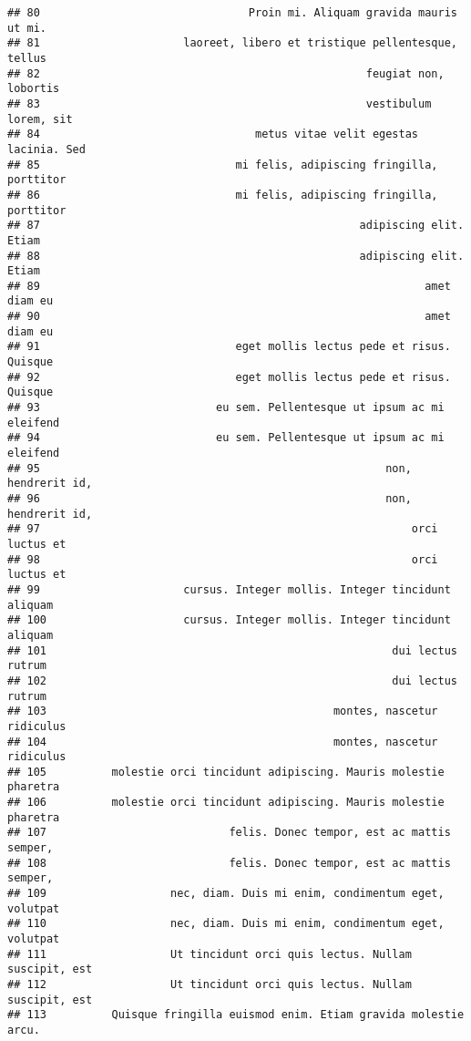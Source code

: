 \documentclass[
]{article}
\begin{document}
\begin{verbatim}
## 80                                Proin mi. Aliquam gravida mauris ut mi.
## 81                      laoreet, libero et tristique pellentesque, tellus
## 82                                                  feugiat non, lobortis
## 83                                                  vestibulum lorem, sit
## 84                                 metus vitae velit egestas lacinia. Sed
## 85                              mi felis, adipiscing fringilla, porttitor
## 86                              mi felis, adipiscing fringilla, porttitor
## 87                                                 adipiscing elit. Etiam
## 88                                                 adipiscing elit. Etiam
## 89                                                           amet diam eu
## 90                                                           amet diam eu
## 91                              eget mollis lectus pede et risus. Quisque
## 92                              eget mollis lectus pede et risus. Quisque
## 93                           eu sem. Pellentesque ut ipsum ac mi eleifend
## 94                           eu sem. Pellentesque ut ipsum ac mi eleifend
## 95                                                     non, hendrerit id,
## 96                                                     non, hendrerit id,
## 97                                                         orci luctus et
## 98                                                         orci luctus et
## 99                      cursus. Integer mollis. Integer tincidunt aliquam
## 100                     cursus. Integer mollis. Integer tincidunt aliquam
## 101                                                     dui lectus rutrum
## 102                                                     dui lectus rutrum
## 103                                            montes, nascetur ridiculus
## 104                                            montes, nascetur ridiculus
## 105          molestie orci tincidunt adipiscing. Mauris molestie pharetra
## 106          molestie orci tincidunt adipiscing. Mauris molestie pharetra
## 107                            felis. Donec tempor, est ac mattis semper,
## 108                            felis. Donec tempor, est ac mattis semper,
## 109                   nec, diam. Duis mi enim, condimentum eget, volutpat
## 110                   nec, diam. Duis mi enim, condimentum eget, volutpat
## 111                   Ut tincidunt orci quis lectus. Nullam suscipit, est
## 112                   Ut tincidunt orci quis lectus. Nullam suscipit, est
## 113          Quisque fringilla euismod enim. Etiam gravida molestie arcu.

\end{verbatim}
\end{document}
